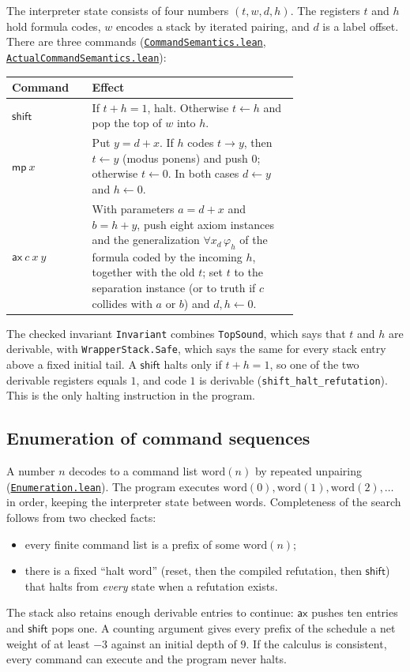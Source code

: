 \documentclass[11pt,letterpaper]{article}
\newcommand{\src}[2]{\href{https://github.com/jamesyc/BusyBeaver/blob/034d08df73b94e9f4036fc5af74b694eb73afc67/#1}{\texttt{\nolinkurl{#2}}}}
\newcommand{\repo}[1]{\texttt{\nolinkurl{#1}}}
\begin{document}
The interpreter state consists of four numbers $(t,w,d,h)$. The registers
$t$ and $h$ hold formula codes, $w$ encodes a stack by iterated pairing,
and $d$ is a label offset. There are three commands
(\src{Lean/metamathematics/PA215PA/CommandSemantics.lean}{CommandSemantics.lean},
\src{Lean/metamathematics/PA215PA/ActualCommandSemantics.lean}{ActualCommandSemantics.lean}):
\begin{center}\small
\begin{tabular}{@{}lp{0.72\linewidth}@{}}
\toprule
Command & Effect \\
\midrule
$\mathsf{shift}$ & If $t+h=1$, halt. Otherwise $t\gets h$ and pop the
top of $w$ into $h$. \\
$\mathsf{mp}\ x$ & Put $y=d+x$. If $h$ codes $t\to y$, then $t\gets y$
(modus ponens) and push $0$; otherwise $t\gets 0$. In both cases
$d\gets y$ and $h\gets 0$. \\
$\mathsf{ax}\ c\ x\ y$ & With parameters $a=d+x$ and $b=h+y$, push eight
axiom instances and the generalization $\forall x_d\,\varphi_h$ of the
formula coded by the incoming $h$, together
with the old $t$; set $t$ to the separation instance (or to truth if $c$
collides with $a$ or $b$) and $d,h\gets0$. \\
\bottomrule
\end{tabular}
\end{center}
The checked invariant \texttt{Invariant} combines \texttt{TopSound}, which
says that $t$ and $h$ are derivable, with \texttt{WrapperStack.Safe}, which
says the same for every stack entry above a fixed initial tail. A $\mathsf{shift}$
halts only if $t+h=1$, so one of the two derivable registers equals $1$,
and code $1$ is derivable (\repo{shift_halt_refutation}). This is the
only halting instruction in the program.

\subsection{Enumeration of command sequences}

A number $n$ decodes to a command list $\mathrm{word}(n)$ by repeated
unpairing
(\src{Lean/PA215/Source/Enumeration.lean}{Enumeration.lean}). The program
executes $\mathrm{word}(0),\mathrm{word}(1),\mathrm{word}(2),\ldots$ in
order, keeping the interpreter state between words. Completeness of the
search follows from two checked facts:
\begin{itemize}
\item every finite command list is a prefix of some $\mathrm{word}(n)$;
\item there is a fixed ``halt word'' (reset, then the compiled
refutation, then $\mathsf{shift}$) that halts from \emph{every} state when
a refutation exists.
\end{itemize}
The stack also retains enough derivable entries to continue:
$\mathsf{ax}$ pushes ten entries and $\mathsf{shift}$ pops one. A counting
argument gives every prefix of the schedule a net weight of at least $-3$
against an initial depth of $9$. If the calculus is consistent, every
command can execute and the program never halts.
\end{document}
